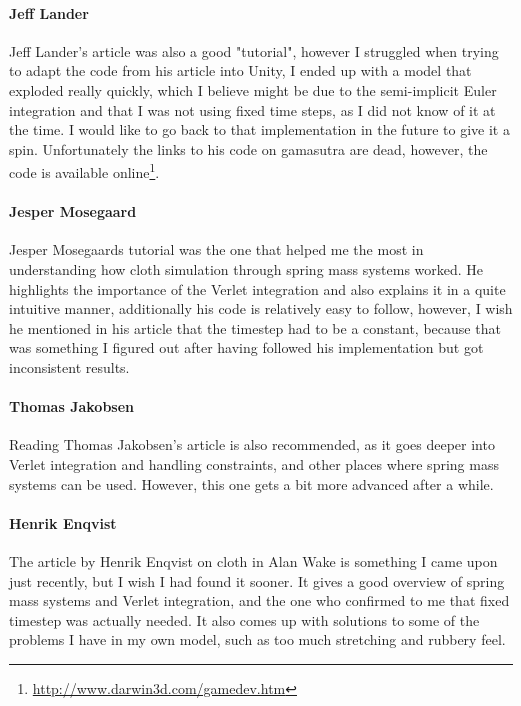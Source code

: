 \paragraph{Jeff Lander} 
Jeff Lander's article was also a good "tutorial", however I struggled when trying to adapt the code from his article\cite{jeff_lander_real_time_cloth} into Unity,
I ended up with a model that exploded really quickly, which I believe might be due to the semi-implicit Euler integration and that I was not using fixed time steps,
as I did not know of it at the time. I would like to go back to that implementation in the future to give it a spin. 
Unfortunately the links to his code on gamasutra are dead, however, the code is available online\footnote{\url{http://www.darwin3d.com/gamedev.htm}}.

\paragraph{Jesper Mosegaard}
Jesper Mosegaards tutorial\cite{mosegaards_clothing_simulation} was the one that helped me the most in understanding how cloth simulation through spring mass systems worked.
He highlights the importance of the Verlet integration and also explains it in a quite intuitive manner, additionally his code
is relatively easy to follow, however, I wish he mentioned in his article that the timestep had to be a constant, because that was something I figured out
after having followed his implementation but got inconsistent results.

\paragraph{Thomas Jakobsen}
Reading Thomas Jakobsen's\cite{jakobsen_advanced_character_physics} article is also recommended, as it goes deeper into Verlet integration and handling constraints,
and other places where spring mass systems can be used. However, this one gets a bit more advanced after a while.

\paragraph{Henrik Enqvist}
The article by Henrik Enqvist\cite{alan_wake_mass_spring} on cloth in Alan Wake is something I came upon just recently, but I wish I had found it sooner.
It gives a good overview of spring mass systems and Verlet integration, and the one who confirmed to me that fixed timestep was actually needed.
It also comes up with solutions to some of the problems I have in my own model, such as too much stretching and rubbery feel.

